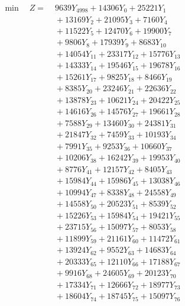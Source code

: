 \documentclass[a4paper,10pt]{article}
\begin{document}
\allowdisplaybreaks
{\small
\begin{align}
\min \quad Z = &\; 9639 Y_{4998} + 14306 Y_{0} + 25221 Y_{1} \\[0.3ex]
&\;  + 13169 Y_{2} + 21095 Y_{3} + 7160 Y_{4} \\[0.3ex]
&\;  + 11522 Y_{5} + 12470 Y_{6} + 19900 Y_{7} \\[0.3ex]
&\;  + 9806 Y_{8} + 17939 Y_{9} + 8683 Y_{10} \\[0.3ex]
&\;  + 14054 Y_{11} + 23317 Y_{12} + 15776 Y_{13} \\[0.3ex]
&\;  + 14333 Y_{14} + 19546 Y_{15} + 19678 Y_{16} \\[0.3ex]
&\;  + 15261 Y_{17} + 9825 Y_{18} + 8466 Y_{19} \\[0.3ex]
&\;  + 8385 Y_{20} + 23246 Y_{21} + 22636 Y_{22} \\[0.3ex]
&\;  + 13878 Y_{23} + 10621 Y_{24} + 20422 Y_{25} \\[0.3ex]
&\;  + 14616 Y_{26} + 14576 Y_{27} + 19661 Y_{28} \\[0.5ex]\allowbreak
&\;  + 7588 Y_{29} + 13460 Y_{30} + 24381 Y_{31} \\[0.3ex]
&\;  + 21847 Y_{32} + 7459 Y_{33} + 10193 Y_{34} \\[0.3ex]
&\;  + 7991 Y_{35} + 9253 Y_{36} + 10660 Y_{37} \\[0.3ex]
&\;  + 10206 Y_{38} + 16242 Y_{39} + 19953 Y_{40} \\[0.3ex]
&\;  + 8776 Y_{41} + 12157 Y_{42} + 8405 Y_{43} \\[0.3ex]
&\;  + 15984 Y_{44} + 15986 Y_{45} + 13038 Y_{46} \\[0.3ex]
&\;  + 10994 Y_{47} + 8338 Y_{48} + 24558 Y_{49} \\[0.3ex]
&\;  + 14558 Y_{50} + 20523 Y_{51} + 8539 Y_{52} \\[0.3ex]
&\;  + 15226 Y_{53} + 15984 Y_{54} + 19421 Y_{55} \\[0.3ex]
&\;  + 23715 Y_{56} + 15097 Y_{57} + 8053 Y_{58} \\[0.5ex]\allowbreak
&\;  + 11899 Y_{59} + 21161 Y_{60} + 11472 Y_{61} \\[0.3ex]
&\;  + 13924 Y_{62} + 9552 Y_{63} + 14683 Y_{64} \\[0.3ex]
&\;  + 20333 Y_{65} + 12110 Y_{66} + 17188 Y_{67} \\[0.3ex]
&\;  + 9916 Y_{68} + 24605 Y_{69} + 20123 Y_{70} \\[0.3ex]
&\;  + 17334 Y_{71} + 12666 Y_{72} + 18977 Y_{73} \\[0.3ex]
&\;  + 18604 Y_{74} + 18745 Y_{75} + 15097 Y_{76} \\[0.3ex]

\end{align}}
\end{document}
